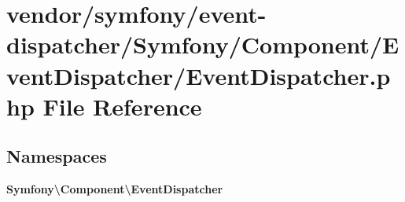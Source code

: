 \section{vendor/symfony/event-\/dispatcher/\+Symfony/\+Component/\+Event\+Dispatcher/\+Event\+Dispatcher.php File Reference}
\label{symfony_2event-dispatcher_2_symfony_2_component_2_event_dispatcher_2_event_dispatcher_8php}
\subsection*{Namespaces}
\begin{DoxyCompactItemize}
\item 
 {\bf Symfony\textbackslash{}\+Component\textbackslash{}\+Event\+Dispatcher}
\end{DoxyCompactItemize}

